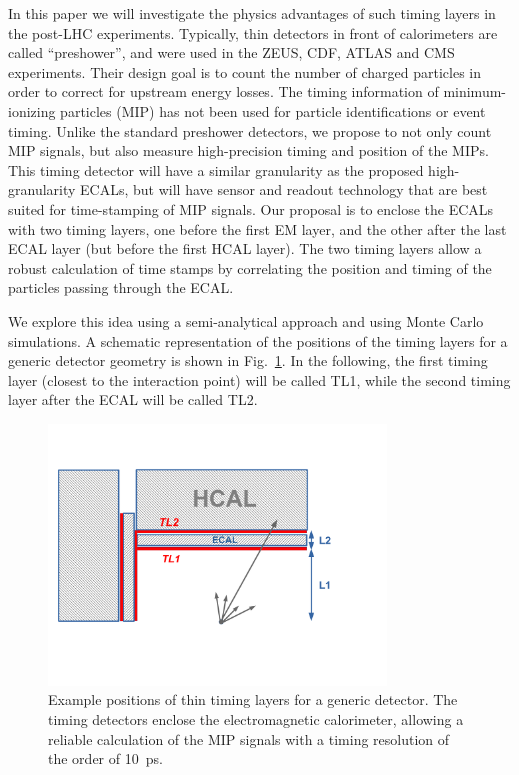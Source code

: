\documentclass[final,1p,11pt]{elsarticle}
\begin{document}
In this paper we  will investigate the physics advantages of such timing layers in the post-LHC experiments. 
Typically, thin detectors in front of calorimeters are called ``preshower'', and were used in the  ZEUS, CDF, ATLAS and CMS experiments.
Their design goal is to count the number of charged
particles in order to correct for upstream energy losses. The timing information of minimum-ionizing particles (MIP) has 
not been used for particle identifications or event timing. 
Unlike the standard preshower detectors, we propose to not only count MIP signals, but also measure 
 high-precision timing and position of the MIPs.
This timing detector will have a similar granularity as the proposed high-granularity ECALs, 
but will have sensor and readout technology that are best suited for time-stamping of MIP signals.
Our proposal is to enclose the ECALs with two timing layers, one before the first EM layer, and the other after the 
last ECAL layer (but before the first HCAL layer). The two timing layers allow a robust calculation of time stamps by correlating 
 the position and timing of the particles passing through the ECAL.

We explore this idea using a semi-analytical approach and using Monte Carlo simulations. 
A schematic representation of the positions of the timing layers for a generic detector geometry is shown in Fig.~\ref{fig:eff_rad}. 
In the following, the first timing layer (closest to the interaction point) will be called TL1, while the second timing layer after the
 ECAL will be called TL2.

\begin{figure}
\begin{center}
   \includegraphics[width=0.8\textwidth]{timing_layer.pdf}\hfill
\end{center}
\caption{Example positions of thin timing layers for a generic detector. The timing detectors  enclose the 
electromagnetic calorimeter, allowing  a reliable calculation of the  MIP signals with a timing resolution of the order of 10~ps.}
\label{fig:eff_rad}
\end{figure}
\end{document}
